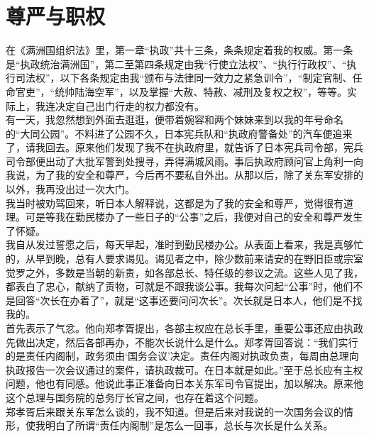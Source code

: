 \fancyhead[RO]{} %
\fancyhead[LE]{} %
\chapter*{尊严与职权}
\thispagestyle{empty}
在《满洲国组织法》里，第一章“执政”共十三条，条条规定着我的权威。第一条是“执政统治满洲国”，第二至第四条规定由我“行使立法权”、“执行行政权”、“执行司法权”，以下各条规定由我“颁布与法律同一效力之紧急训令”，“制定官制、任命官吏”，“统帅陆海空军”，以及掌握“大赦、特赦、减刑及复权之权”，等等。实际上，我连决定自己出门行走的权力都没有。\\

有一天，我忽然想到外面去逛逛，便带着婉容和两个妹妹来到以我的年号命名的“大同公园”。不料进了公园不久，日本宪兵队和“执政府警备处”的汽车便追来了，请我回去。原来他们发现了我不在执政府里，就告诉了日本宪兵司令部，宪兵司令部便出动了大批军警到处搜寻，弄得满城风雨。事后执政府顾问官上角利一向我说，为了我的安全和尊严，今后再不要私自外出。从那以后，除了关东军安排的以外，我再没出过一次大门。\\

我当时被劝驾回来，听日本人解释说，这都是为了我的安全和尊严，觉得很有道理。可是等我在勤民楼办了一些日子的“公事”之后，我便对自己的安全和尊严发生了怀疑。\\

我自从发过誓愿之后，每天早起，准时到勤民楼办公。从表面上看来，我是真够忙的，从早到晚，总有人要求谒见。谒见者之中，除少数前来请安的在野旧臣或宗室觉罗之外，多数是当朝的新贵，如各部总长、特任级的参议之流。这些人见了我，都表白了忠心，献纳了贡物，可就是不跟我谈公事。我每次问起“公事”时，他们不是回答“次长在办着了”，就是“这事还要问问次长”。次长就是日本人，他们是不找我的。\\

首先表示了气忿。他向郑孝胥提出，各部主权应在总长手里，重要公事还应由执政先做出决定，然后各部再办，不能次长说什么是什么。郑孝胥回答说：“我们实行的是责任内阁制，政务须由‘国务会议’决定。责任内阁对执政负责，每周由总理向执政报告一次会议通过的案件，请执政裁可。在日本就是如此。”至于总长应有主权问题，他也有同感。他说此事正准备向日本关东军司令官提出，加以解决。原来他这个总理与国务院的总务厅长官之间，也存在着这个问题。\\

郑孝胥后来跟关东军怎么谈的，我不知道。但是后来对我说的一次国务会议的情形，使我明白了所谓“责任内阁制”是怎么一回事，总长与次长是什么关系。\\

